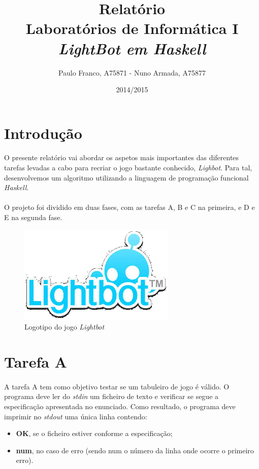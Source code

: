 \documentclass[a4paper,12pt]{article}
\title{Relatório\\[1.5em]
Laboratórios de Informática I\\
\emph{LightBot em Haskell}}
\author{Paulo Franco, A75871 - Nuno Armada, A75877}
\date{2014/2015}
\begin{document}
\maketitle
\clearpage
\tableofcontents

\clearpage
\section{Introdução}

\paragraph{}
O presente relatório vai abordar os aspetos mais importantes das diferentes tarefas levadas a cabo para recriar o jogo bastante conhecido, \emph{Lighbot}. Para tal, desenvolvemos um algoritmo utilizando a linguagem de programação funcional \emph{Haskell}.
\paragraph{}
O projeto foi dividido em duas fases, com as tarefas A, B e C na primeira, e D e E na segunda fase.


\begin{figure}[h]
\centering
\includegraphics[scale=0.5]{./imagens/logo.jpg}
\caption{Logotipo do jogo \emph{Lightbot}} \label{Fig:Logo}
\end{figure}


\section{Tarefa A}

\paragraph{}
A tarefa A tem como objetivo testar se um tabuleiro de jogo é válido.
O programa deve ler do \emph{stdin} um ficheiro de texto e verificar se segue a especificação apresentada no enunciado. Como resultado, o programa deve imprimir no \emph{stdout} uma única linha contendo:
\begin{itemize}
\item \textbf{OK}, se o ficheiro estiver conforme a especificação;
\item \textbf{num}, no caso de erro (sendo num o número da linha onde ocorre o primeiro erro).

\end{itemize}
\end{document}
